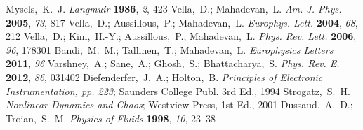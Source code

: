 \documentclass[journal=langd5, manuscript=article, layout=twocolumn]{achemso}
\begin{document}
\begin{mcitethebibliography}{27}
{\mcitedefaultendpunct}{\mcitedefaultseppunct}\relax
\EndOfBibitem
{}
Mysels,~K.~J. \emph{Langmuir} \textbf{1986}, \emph{2}, 423\relax
\mciteBstWouldAddEndPuncttrue
\mciteSetBstMidEndSepPunct{\mcitedefaultmidpunct}
{\mcitedefaultendpunct}{\mcitedefaultseppunct}\relax
\EndOfBibitem
{}
Vella,~D.; Mahadevan,~L. \emph{Am. J. Phys.} \textbf{2005}, \emph{73},
  817\relax
\mciteBstWouldAddEndPuncttrue
\mciteSetBstMidEndSepPunct{\mcitedefaultmidpunct}
{\mcitedefaultendpunct}{\mcitedefaultseppunct}\relax
\EndOfBibitem
{}
Vella,~D.; Aussillous,~P.; Mahadevan,~L. \emph{Europhys. Lett.} \textbf{2004},
  \emph{68}, 212\relax
\mciteBstWouldAddEndPuncttrue
\mciteSetBstMidEndSepPunct{\mcitedefaultmidpunct}
{\mcitedefaultendpunct}{\mcitedefaultseppunct}\relax
\EndOfBibitem
{}
Vella,~D.; Kim,~H.-Y.; Aussillous,~P.; Mahadevan,~L. \emph{Phys. Rev. Lett.}
  \textbf{2006}, \emph{96}, 178301\relax
\mciteBstWouldAddEndPuncttrue
\mciteSetBstMidEndSepPunct{\mcitedefaultmidpunct}
{\mcitedefaultendpunct}{\mcitedefaultseppunct}\relax
\EndOfBibitem
{}
Bandi,~M.~M.; Tallinen,~T.; Mahadevan,~L. \emph{Europhysics Letters}
  \textbf{2011}, \emph{96}\relax
\mciteBstWouldAddEndPuncttrue
\mciteSetBstMidEndSepPunct{\mcitedefaultmidpunct}
{\mcitedefaultendpunct}{\mcitedefaultseppunct}\relax
\EndOfBibitem
{}
Varshney,~A.; Sane,~A.; Ghosh,~S.; Bhattacharya,~S. \emph{Phys. Rev. E.}
  \textbf{2012}, \emph{86}, 031402\relax
\mciteBstWouldAddEndPuncttrue
\mciteSetBstMidEndSepPunct{\mcitedefaultmidpunct}
{\mcitedefaultendpunct}{\mcitedefaultseppunct}\relax
\EndOfBibitem
{}
Diefenderfer,~J.~A.; Holton,~B. \emph{Principles of Electronic Instrumentation,
  pp. 223}; Saunders College Publ. 3rd Ed., 1994\relax
\mciteBstWouldAddEndPuncttrue
\mciteSetBstMidEndSepPunct{\mcitedefaultmidpunct}
{\mcitedefaultendpunct}{\mcitedefaultseppunct}\relax
\EndOfBibitem
{}
Strogatz,~S.~H. \emph{Nonlinear Dynamics and Chaos}; Westview Press, 1st Ed.,
  2001\relax
\mciteBstWouldAddEndPuncttrue
\mciteSetBstMidEndSepPunct{\mcitedefaultmidpunct}
{\mcitedefaultendpunct}{\mcitedefaultseppunct}\relax
\EndOfBibitem
{}
Dussaud,~A.~D.; Troian,~S.~M. \emph{Physics of Fluids} \textbf{1998},
  \emph{10}, 23--38\relax
\mciteBstWouldAddEndPuncttrue
\mciteSetBstMidEndSepPunct{\mcitedefaultmidpunct}
{\mcitedefaultendpunct}{\mcitedefaultseppunct}\relax
\EndOfBibitem
\end{mcitethebibliography}
\end{document}
